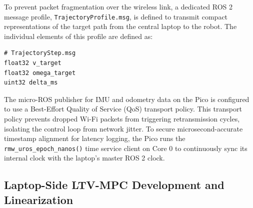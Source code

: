 \documentclass[a4paper,twoside,12pt]{report}
\begin{document}
To prevent packet fragmentation over the wireless link, a dedicated ROS 2 message profile, \texttt{TrajectoryProfile.msg}, is defined to transmit compact representations of the target path from the central laptop to the robot. The individual elements of this profile are defined as:
\begin{verbatim}
# TrajectoryStep.msg
float32 v_target
float32 omega_target
uint32 delta_ms
\end{verbatim}
The micro-ROS publisher for IMU and odometry data on the Pico is configured to use a Best-Effort Quality of Service (QoS) transport policy. This transport policy prevents dropped Wi-Fi packets from triggering retransmission cycles, isolating the control loop from network jitter. To secure microsecond-accurate timestamp alignment for latency logging, the Pico runs the \texttt{rmw\_uros\_epoch\_nanos()} time service client on Core 0 to continuously sync its internal clock with the laptop's master ROS 2 clock.

\subsection{Laptop-Side LTV-MPC Development and Linearization}
\end{document}
